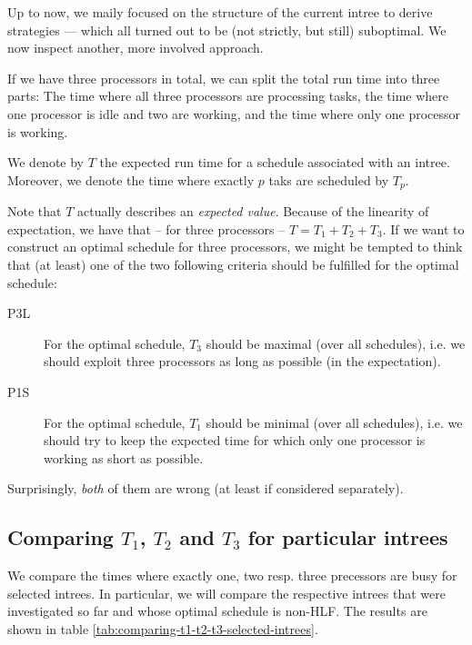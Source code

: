 Up to now, we maily focused on the structure of the current intree to derive strategies --- which all turned out to be (not strictly, but still) suboptimal. We now inspect another, more involved approach.

If we have three processors in total, we can split the total run time into three parts: The time where all three processors are processing tasks, the time where one processor is idle and two are working, and the time where only one processor is working.


\begin{definition}
  We denote by $T$ the expected run time for a schedule associated with an intree. 
  Moreover, we denote the time where exactly $p$ taks are scheduled by $T_p$.
\end{definition}

Note that $T$ actually describes an \emph{expected value}. Because of the linearity of expectation, we have that -- for three processors -- $T=T_1 + T_2 + T_3$. If we want to construct an optimal schedule for three processors, we might be tempted to think that (at least) one of the two following criteria should be fulfilled for the optimal schedule:

\begin{description}
\item[P3L] For the optimal schedule, $T_3$ should be maximal (over all schedules), i.e. we should exploit three processors as long as possible (in the expectation).
\item[P1S] For the optimal schedule, $T_1$ should be minimal (over all schedules), i.e. we should try to keep the expected time for which only one processor is working as short as possible.
\end{description}

Surprisingly, \emph{both} of them are wrong (at least if considered separately).

\subsection{Comparing $T_1$, $T_2$ and $T_3$ for particular intrees}
\label{sec:comparing-t1-t2-t3-particular-intrees}

We compare the times where exactly one, two resp. three precessors are busy for selected intrees. In particular, we will compare the respective intrees that were investigated so far and whose optimal schedule is non-HLF. The results are shown in table \ref{tab:comparing-t1-t2-t3-selected-intrees}.

